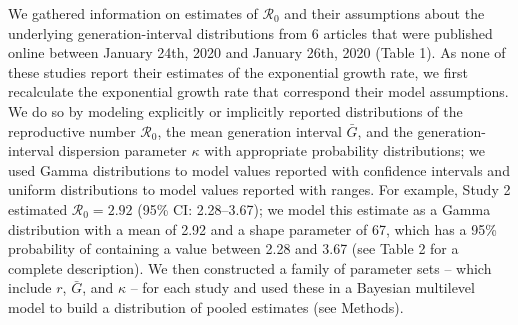 \documentclass[12pt]{article}
\newcommand{\Rx}[1]{\ensuremath{{\mathcal R}_{#1}}}
\newcommand{\Ro}{\Rx{0}\xspace}
\begin{document}
We gathered information on estimates of \Ro and their assumptions about the underlying generation-interval distributions from 6 articles that were published online between January 24th, 2020 and January 26th, 2020 (Table 1).
As none of these studies report their estimates of the exponential growth rate, we first recalculate the exponential growth rate that correspond their model assumptions.
We do so by modeling explicitly or implicitly reported distributions of the reproductive number \Ro, the mean generation interval $\bar G$, and the generation-interval dispersion parameter $\kappa$ with appropriate probability distributions;
we used Gamma distributions to model values reported with confidence intervals and uniform distributions to model values reported with ranges.
For example, Study 2 estimated $\Ro = 2.92$ (95\% CI: 2.28--3.67);
we model this estimate as a Gamma distribution with a mean of 2.92 and a shape parameter of 67, which has a 95\% probability of containing a value between 2.28 and 3.67 (see Table 2 for a complete description).
We then constructed a family of parameter sets -- which include $r$, $\bar G$, and $\kappa$ -- for each study and used these in a Bayesian multilevel model to build a distribution of pooled estimates (see Methods).
\end{document}
